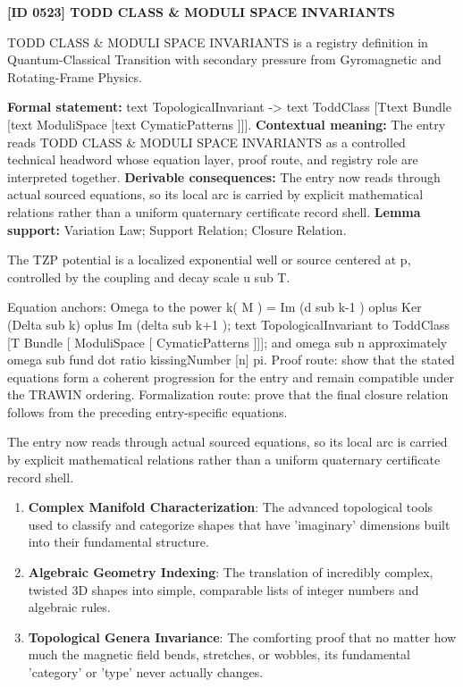 \clearpage
\noindent\textbf{[ID 0523] TODD CLASS \& MODULI SPACE INVARIANTS}\par
\vspace{0.35em}
\begingroup\small
{}
TODD CLASS \& MODULI SPACE INVARIANTS is a registry definition in Quantum-Classical Transition with secondary pressure from Gyromagnetic and Rotating-Frame Physics.

\begingroup\footnotesize\setlength{\emergencystretch}{3em}\sloppy
\textbf{Formal statement:} text TopologicalInvariant -> text ToddClass [Ttext Bundle [text ModuliSpace [text CymaticPatterns ]]]. \textbf{Contextual meaning:} The entry reads TODD CLASS \& MODULI SPACE INVARIANTS as a controlled technical headword whose equation layer, proof route, and registry role are interpreted together. \textbf{Derivable consequences:} The entry now reads through actual sourced equations, so its local arc is carried by explicit mathematical relations rather than a uniform quaternary certificate record shell. \textbf{Lemma support:} Variation Law; Support Relation; Closure Relation.\par
\endgroup

The TZP potential is a localized exponential well or source centered at p, controlled by the coupling and decay scale u sub T.

Equation anchors: Omega to the power k( M ) = Im (d sub k-1 ) oplus Ker (Delta sub k) oplus Im (delta sub k+1 ); text TopologicalInvariant to ToddClass [T Bundle [ ModuliSpace [ CymaticPatterns ]]]; and omega sub n approximately omega sub fund dot ratio kissingNumber [n] pi. Proof route: show that the stated equations form a coherent progression for the entry and remain compatible under the TRAWIN ordering. Formalization route: prove that the final closure relation follows from the preceding entry-specific equations.

The entry now reads through actual sourced equations, so its local arc is carried by explicit mathematical relations rather than a uniform quaternary certificate record shell.
\endgroup

\begin{enumerate}[leftmargin=1.6em,itemsep=6pt,topsep=4pt]
\item \textbf{Complex Manifold Characterization}: The advanced topological tools used to classify and categorize shapes that have 'imaginary' dimensions built into their fundamental structure.
\item \textbf{Algebraic Geometry Indexing}: The translation of incredibly complex, twisted 3D shapes into simple, comparable lists of integer numbers and algebraic rules.
\item \textbf{Topological Genera Invariance}: The comforting proof that no matter how much the magnetic field bends, stretches, or wobbles, its fundamental 'category' or 'type' never actually changes.
\end{enumerate}

